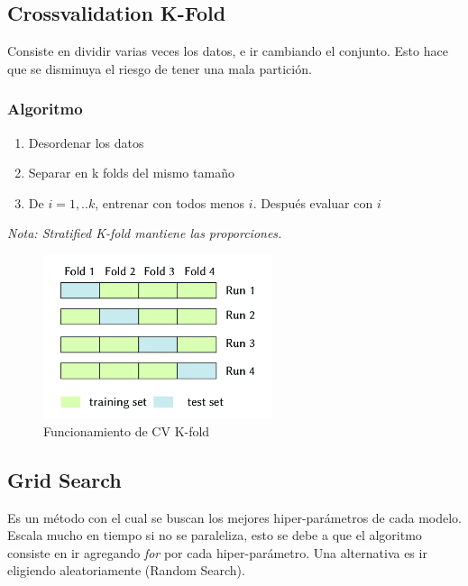 \documentclass[titlepage,a4paper]{article}
\begin{document}
\subsection{Crossvalidation K-Fold}

Consiste en dividir varias veces los datos, e ir cambiando el conjunto. Esto hace que se disminuya el riesgo de tener una mala partición.

\subsubsection*{Algoritmo}
\begin{enumerate}
    \item Desordenar los datos
    \item Separar en k folds del mismo tamaño
    \item De $i = 1,..k$, entrenar con todos menos $i$. Después evaluar con $i$  
\end{enumerate}

\textit{Nota: Stratified K-fold mantiene las proporciones.}

\begin{figure}[!htb]
    \centering
    \includegraphics[width=0.6\textwidth]{imagenesResumen/CVKFold.png}
    \caption{Funcionamiento de CV K-fold}
\end{figure}

\subsection{Grid Search}

Es un método con el cual se buscan los mejores hiper-parámetros de cada modelo. Escala mucho en tiempo si no se paraleliza, esto se debe a que el algoritmo consiste en ir agregando \textit{for} por cada hiper-parámetro. Una alternativa es ir eligiendo aleatoriamente (Random Search).
\end{document}

